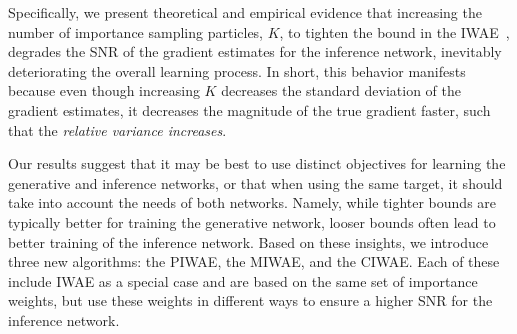 Specifically, we present theoretical and empirical evidence that increasing the
number of importance sampling particles, $K$, to tighten the bound in the \gls{IWAE}~\citep{burda2016importance}, degrades the \gls{SNR} of the
gradient estimates for the inference network, inevitably deteriorating the overall learning process.  In short, this behavior manifests because even though increasing
$K$ decreases the standard deviation of the gradient estimates, it decreases
the magnitude of the true gradient faster, such that the \emph{relative variance increases}.
%

Our results suggest that it may be best to use distinct objectives for learning
the generative and inference networks, or that when using the same target, it should
take into account the needs of both networks.
Namely, while tighter bounds are typically better for training
the generative network, looser bounds often lead to better
training of the inference network.
Based on these insights, we introduce three new algorithms: the \gls{PIWAE}, the \gls{MIWAE}, and the \gls{CIWAE}. Each of these include \gls{IWAE} as a special case and are based on the same set of importance weights, 
but use these weights in different ways to ensure a higher SNR for the
inference network.  

